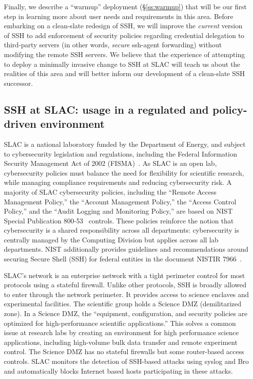 \documentclass[10pt]{article}
\begin{document}
Finally, we describe a ``warmup'' deployment (\S\ref{ss:warmup}) that
will be our first step in learning more about user needs and
requirements in this area. Before embarking on a clean-slate redesign
of SSH, we will improve the \emph{current} version of SSH to add
enforcement of security policies regarding credential delegation to
third-party servers (in other words, \emph{secure} ssh-agent
forwarding) without modifying the remote SSH servers. We believe that
the experience of attempting to deploy a minimally invasive change to
SSH at SLAC will teach us about the realities of this area and will
better inform our development of a clean-slate SSH successor.

\subsection{SSH at SLAC: usage in a regulated and policy-driven environment}
\label{ss:sshatslac}
SLAC is a national laboratory funded by the Department of Energy, and
subject to cybersecurity legislation and regulations, including the
Federal Information Security Management Act of 2002
(FISMA)~\cite{fisma}. As SLAC is an open lab, cybersecurity policies
must balance the need for flexibility for scientific research, while
managing compliance requirements and reducing cybersecurity risk. A
majority of SLAC cybersecurity policies, including the ``Remote Access
Management Policy,'' the ``Account Management Policy,'' the ``Access
Control Policy,'' and the ``Audit Logging and Monitoring Policy,'' are
based on NIST Special Publication 800-53~\cite{nist80053}
controls. These policies reinforce the notion that cybersecurity is a
shared responsibility across all departments: cybersecurity is
centrally managed by the Computing Division but applies across all lab
departments. NIST additionally provides guidelines and recommendations
around securing Secure Shell (SSH) for federal entities in the
document NISTIR 7966~\cite{nistSSH}.

SLAC's network is an enterprise network with a tight perimeter control
for most protocols using a stateful firewall. Unlike other protocols,
SSH is broadly allowed to enter through the network perimeter. It
provides access to science enclaves and experimental facilities. The
scientific group holds a Science DMZ (demilitarized zone). In a
Science DMZ, the ``equipment, configuration, and security policies are
optimized for high-performance scientific applications.'' This solves
a common issue at research labs by creating an environment for high
performance science applications, including high-volume bulk data
transfer and remote experiment control. The Science DMZ has no
stateful firewalls but some router-based access controls. SLAC
monitors the detection of SSH-based attacks using syslog and Bro and
automatically blocks Internet based hosts participating in these
attacks.
\end{document}
